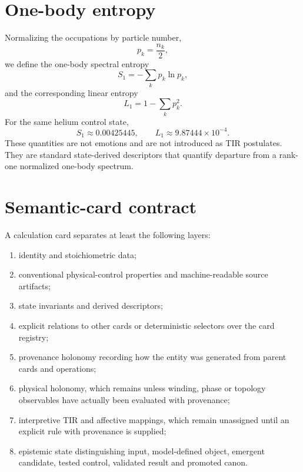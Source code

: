 \section{One-body entropy}
Normalizing the occupations by particle number,
\begin{equation}
p_k=\frac{n_k}{2},
\end{equation}
we define the one-body spectral entropy
\begin{equation}
S_1=-\sum_k p_k\ln p_k,
\end{equation}
and the corresponding linear entropy
\begin{equation}
L_1=1-\sum_k p_k^2.
\end{equation}
For the same helium control state,
\begin{equation}
S_1\approx 0.00425445,\qquad L_1\approx 9.87444\times10^{-4}.
\end{equation}
These quantities are not emotions and are not introduced as TIR postulates. They are standard state-derived descriptors that quantify departure from a rank-one normalized one-body spectrum.

\section{Semantic-card contract}
A calculation card separates at least the following layers:
\begin{enumerate}
\item identity and stoichiometric data;
\item conventional physical-control properties and machine-readable source artifacts;
\item state invariants and derived descriptors;
\item explicit relations to other cards or deterministic selectors over the card registry;
\item provenance holonomy recording how the entity was generated from parent cards and operations;
\item physical holonomy, which remains  unless winding, phase or topology observables have actually been evaluated with provenance;
\item interpretive TIR and affective mappings, which remain unassigned until an explicit rule with provenance is supplied;
\item epistemic state distinguishing input, model-defined object, emergent candidate, tested control, validated result and promoted canon.
\end{enumerate}

